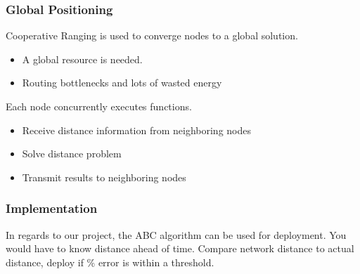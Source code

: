 \begin{frame}[t]
  \frametitle{Global Positioning}

  Cooperative Ranging is used to converge nodes to a global solution.
  \begin{itemize}
  \item A global resource is needed.
  \item Routing bottlenecks and lots of wasted energy
  \end{itemize}

  Each node concurrently executes functions.
  \begin{itemize}
  \item Receive distance information from neighboring nodes
  \item Solve distance problem
  \item Transmit results to neighboring nodes
  \end{itemize}

  \vfill
    \begin{flushleft}
    \begin{tiny}
      \begin{minipage}{1.0\linewidth}
      \end{minipage}
    \end{tiny}
  \end{flushleft}

\end{frame}

\begin{frame}[t]
  \frametitle{Implementation}

  \vfill 
  In regards to our project, the ABC algorithm can be used for deployment.
  \vfill
  You would have to know distance ahead of time.
  \vfill
  Compare network distance to actual distance, deploy if \% error is within a
  threshold.

  \vfill
    \begin{flushleft}
    \begin{tiny}
      \begin{minipage}{1.0\linewidth}
      \end{minipage}
    \end{tiny}
  \end{flushleft}


\end {frame}

  

  
  
    
